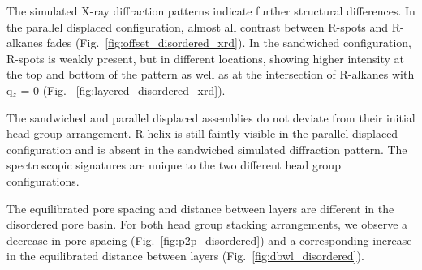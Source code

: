 \documentclass{article}
\begin{document}
  The simulated X-ray diffraction patterns indicate further structural
  differences. In the parallel displaced configuration, almost all contrast
  between R-spots and R-alkanes fades (Fig.~\ref{fig:offset_disordered_xrd}). In
  the sandwiched configuration, R-spots is weakly present, but in different
  locations, showing higher intensity at the top and bottom of the pattern as
  well as at the intersection of R-alkanes with q$_z$ = 0 (Fig.
  ~\ref{fig:layered_disordered_xrd}). 

  The sandwiched and parallel displaced assemblies do not deviate from their
  initial head group arrangement. R-helix is still faintly visible in the
  parallel displaced configuration and is absent in the sandwiched simulated
  diffraction pattern. The spectroscopic signatures are unique to the two
  different head group configurations.

  The equilibrated pore spacing and distance between layers are different in
  the disordered pore basin. For both head group stacking arrangements, we
  observe a decrease in pore spacing (Fig.~\ref{fig:p2p_disordered}) and a
  corresponding increase in the equilibrated distance between layers
  (Fig.~\ref{fig:dbwl_disordered}). 
\end{document}

